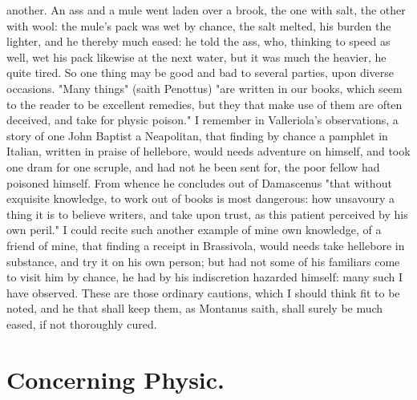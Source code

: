 {another. An ass and a mule went laden over a brook, the one with salt, the other with wool: the mule's pack was wet by chance, the salt melted, his burden the lighter, and he thereby much eased: he told the ass, who, thinking to speed as well, wet his pack likewise at the next water, but it was much the heavier, he quite tired. So one thing may be good and bad to several parties, upon diverse occasions. "Many things" (saith Penottus) "are written in our books, which seem to the reader to be excellent remedies, but they that make use of them are often deceived, and take for physic poison." I remember in Valleriola's observations, a story of one John Baptist a Neapolitan, that finding by chance a pamphlet in Italian, written in praise of hellebore, would needs adventure on himself, and took one dram for one scruple, and had not he been sent for, the poor fellow had poisoned himself. From whence he concludes out of Damascenus  "that without exquisite knowledge, to work out of books is most dangerous: how unsavoury a thing it is to believe writers, and take upon trust, as this patient perceived by his own peril." I could recite such another example of mine own knowledge, of a friend of mine, that finding a receipt in Brassivola, would needs take hellebore in substance, and try it on his own person; but had not some of his familiars come to visit him by chance, he had by his indiscretion hazarded himself: many such I have observed. These are those ordinary cautions, which I should think fit to be noted, and he that shall keep them, as Montanus saith, shall surely be much eased, if not thoroughly cured.

\section{Concerning Physic.}

}
